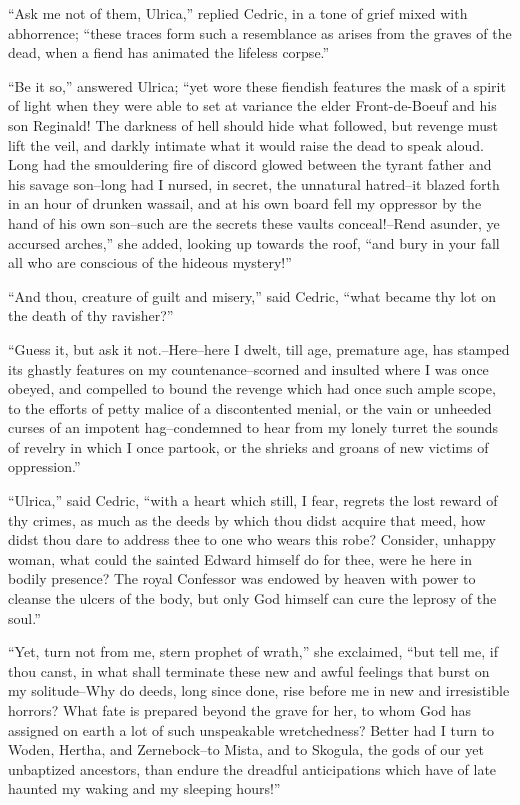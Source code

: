 ``Ask me not of them, Ulrica,'' replied Cedric, in a tone of grief mixed
with abhorrence; ``these traces form such a resemblance as arises from
the graves of the dead, when a fiend has animated the lifeless corpse.''

``Be it so,'' answered Ulrica; ``yet wore these fiendish features the
mask of a spirit of light when they were able to set at variance the
elder Front-de-Boeuf and his son Reginald! The darkness of hell should
hide what followed, but revenge must lift the veil, and darkly intimate
what it would raise the dead to speak aloud. Long had the smouldering
fire of discord glowed between the tyrant father and his savage
son--long had I nursed, in secret, the unnatural hatred--it blazed forth
in an hour of drunken wassail, and at his own board fell my oppressor by
the hand of his own son--such are the secrets these vaults
conceal!--Rend asunder, ye accursed arches,'' she added, looking up
towards the roof, ``and bury in your fall all who are conscious of the
hideous mystery!''

``And thou, creature of guilt and misery,'' said Cedric, ``what became
thy lot on the death of thy ravisher?''

``Guess it, but ask it not.--Here--here I dwelt, till age, premature
age, has stamped its ghastly features on my countenance--scorned and
insulted where I was once obeyed, and compelled to bound the revenge
which had once such ample scope, to the efforts of petty malice of a
discontented menial, or the vain or unheeded curses of an impotent
hag--condemned to hear from my lonely turret the sounds of revelry in
which I once partook, or the shrieks and groans of new victims of
oppression.''

``Ulrica,'' said Cedric, ``with a heart which still, I fear, regrets the
lost reward of thy crimes, as much as the deeds by which thou didst
acquire that meed, how didst thou dare to address thee to one who wears
this robe? Consider, unhappy woman, what could the sainted Edward
himself do for thee, were he here in bodily presence? The royal
Confessor was endowed by heaven with power to cleanse the ulcers of the
body, but only God himself can cure the leprosy of the soul.''

``Yet, turn not from me, stern prophet of wrath,'' she exclaimed, ``but
tell me, if thou canst, in what shall terminate these new and awful
feelings that burst on my solitude--Why do deeds, long since done, rise
before me in new and irresistible horrors? What fate is prepared beyond
the grave for her, to whom God has assigned on earth a lot of such
unspeakable wretchedness? Better had I turn to Woden, Hertha, and
Zernebock--to Mista, and to Skogula, the gods of our yet unbaptized
ancestors, than endure the dreadful anticipations which have of late
haunted my waking and my sleeping hours!''

